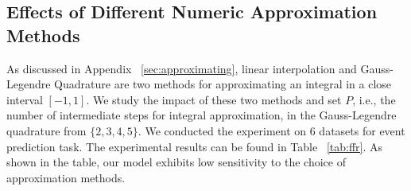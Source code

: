 \begin{table}[t]

    \label{tab:abl}
\end{table}

\subsection{Effects of Different Numeric Approximation Methods}

As discussed in Appendix ~\ref{sec:approximating}, linear interpolation and Gauss-Legendre Quadrature are two methods for approximating an integral in a close interval $[-1, 1]$. We study the impact of these two methods and set $P$, i.e., the number of intermediate steps for integral approximation, in the Gauss-Legendre quadrature from $\{ 2, 3, 4, 5\}$. We conducted the experiment on 6 datasets for event prediction task. The experimental results can be found in Table ~\ref{tab:ffr}. As shown in the table, our model exhibits low sensitivity to the choice of approximation methods.

